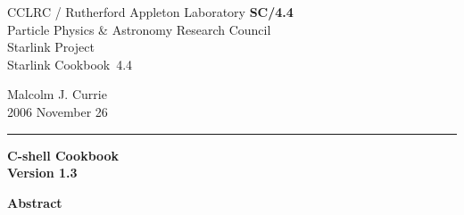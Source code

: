 \documentclass[twoside,11pt]{article}
\newcommand{\stardoccategory}  {Starlink Cookbook}
\newcommand{\stardocinitials}  {SC}
\newcommand{\stardocnumber}    {4.4}
\newcommand{\stardocauthors}   {Malcolm J. Currie}
\newcommand{\stardocdate}      {2006 November 26}
\newcommand{\stardoctitle}     {C-shell Cookbook}
\newcommand{\stardocversion}   {Version 1.3}
\newcommand{\stardocmanual}    {}
\newcommand{\stardocname}{\stardocinitials /\stardocnumber}
\newenvironment{latexonly}{}{}
\begin{document}
\thispagestyle{empty}

\begin{latexonly}
   CCLRC / {\sc Rutherford Appleton Laboratory} \hfill {\bf \stardocname}\\
   {\large Particle Physics \& Astronomy Research Council}\\
   {\large Starlink Project\\}
   {\large \stardoccategory\ \stardocnumber}
   \begin{flushright}
   \stardocauthors\\
   \stardocdate
   \end{flushright}
   \vspace{-4mm}
   \rule{\textwidth}{0.5mm}
   \vspace{5mm}
   \begin{center}
   {\Huge\bf  \stardoctitle \\ [2.5ex]}
   {\LARGE\bf \stardocversion \\ [4ex]}
   {\Huge\bf  \stardocmanual}
   \end{center}
   \vspace{5mm}

   \vspace{10mm}
   \begin{center}
      {\Large\bf Abstract}
   \end{center}
\end{latexonly}
\end{document}
